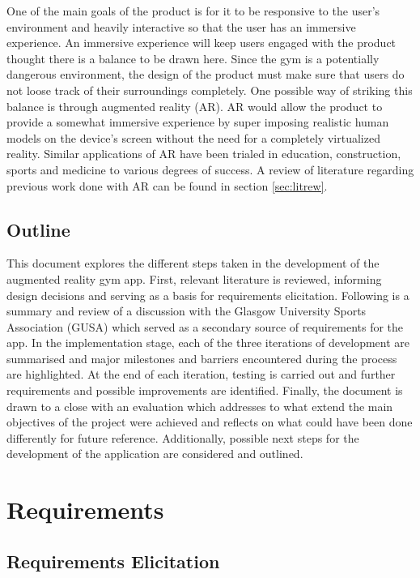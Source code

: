 \documentclass{l4proj}
\begin{document}
One of the main goals of the product is for it to be responsive to the user's environment and heavily interactive so that the user has an immersive experience. An immersive experience will keep users engaged with the product thought there is a balance to be drawn here. Since the gym is a potentially dangerous environment, the design of the product must make sure that users do not loose track of their surroundings completely. One possible way of striking this balance is through augmented reality (AR). AR would allow the product to provide a somewhat immersive experience by super imposing realistic human models on the device's screen without the need for a completely virtualized reality. Similar applications of AR have been trialed in education, construction, sports and medicine to various degrees of success. A review of literature regarding previous work done with AR can be found in section \ref{sec:litrew}.

\section{Outline}
This document explores the different steps taken in the development of the augmented reality gym app. First, relevant literature is reviewed, informing design decisions and serving as a basis for requirements elicitation. Following is a summary and review of a discussion with the Glasgow University Sports Association (GUSA) which served as a secondary source of requirements for the app. In the implementation stage, each of the three iterations of development are summarised and major milestones and barriers encountered during the process are highlighted. At the end of each iteration, testing is carried out and further requirements and possible improvements are identified. Finally, the document is drawn to a close with an evaluation which addresses to what extend the main objectives of the project were achieved and reflects on what could have been done differently for future reference. Additionally, possible next steps for the development of the application are considered and outlined. 

\chapter{Requirements}

\section{Requirements Elicitation}
\end{document}
